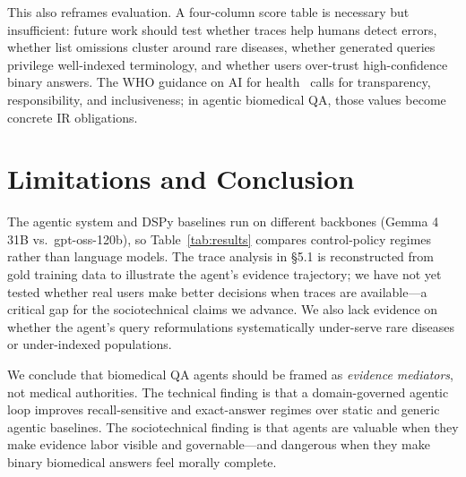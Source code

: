 \documentclass[sigconf,anonymous,review]{acmart}
\begin{document}
This also reframes evaluation.
A four-column score table is necessary but insufficient: future work should test whether traces help humans detect errors, whether list omissions cluster around rare diseases, whether generated queries privilege well-indexed terminology, and whether users over-trust high-confidence binary answers.
The WHO guidance on AI for health~\cite{who2021ethics} calls for transparency, responsibility, and inclusiveness; in agentic biomedical QA, those values become concrete IR obligations.

\section{Limitations and Conclusion}

The agentic system and DSPy baselines run on different backbones (Gemma 4 31B vs.\ gpt-oss-120b), so Table~\ref{tab:results} compares control-policy regimes rather than language models.
The trace analysis in \S5.1 is reconstructed from gold training data to illustrate the agent's evidence trajectory; we have not yet tested whether real users make better decisions when traces are available---a critical gap for the sociotechnical claims we advance.
We also lack evidence on whether the agent's query reformulations systematically under-serve rare diseases or under-indexed populations.

We conclude that biomedical QA agents should be framed as \emph{evidence mediators}, not medical authorities.
The technical finding is that a domain-governed agentic loop improves recall-sensitive and exact-answer regimes over static and generic agentic baselines.
The sociotechnical finding is that agents are valuable when they make evidence labor visible and governable---and dangerous when they make binary biomedical answers feel morally complete.
\end{document}
